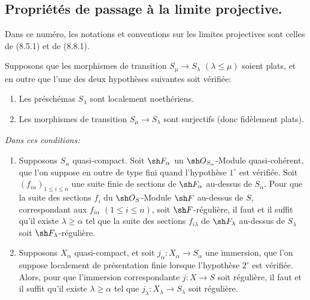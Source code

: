 \subsection{Propriétés de passage à la limite projective.}
\label{IV.19.8}

Dans ce numéro, les notations et conventions sur les limites projectives sont celles de (8.5.1) et de (8.8.1).

\begin{proposition}[19.8.1]
\label{IV.19.8.1}
Supposons que les morphismes de transition $S_\mu\to S_\lambda$ $(\lambda\leq\mu)$ soient plats, et en outre que l'une des deux hypothèses suivantes soit vérifiée:
\begin{enumerate}
  \item[$1^\circ$] Les préschémas $S_\lambda$ sont localement noethériens.
  \item[$2^\circ$] Les morphismes de transition $S_\mu\to S_\lambda$ sont surjectifs (donc fidèlement plats).
\end{enumerate}


\emph{Dans ces conditions:}
\begin{enumerate}
  \item[(i)] Supposons $S_\alpha$ quasi-compact. Soit $\sh F_\alpha$ un $\sh O_{S_\alpha}$-Module quasi-cohérent, que l'on suppose en outre de type fini quand l'hypothèse $1^\circ$ est vérifiée. Soit $(f_{i\alpha})_{1\leq i\leq n}$ une suite finie de sections de $\sh F_\alpha$ au-dessus de $S_\alpha$. Pour que la suite des sections $f_i$ du $\sh O_S$-Module $\sh F$ au-dessus de $S$, correspondant aux $f_{i\alpha}$ $(1\leq i\leq n)$, soit $\sh F$-régulière, il faut et il suffit qu'il existe $\lambda\geq\alpha$ tel que la suite des sections $f_{i\lambda}$ de $\sh F_\lambda$ au-dessus de $S_\lambda$ soit $\sh F_\lambda$-régulière.
  \item[(ii)] Supposons $X_\alpha$ quasi-compact, et soit $j_\alpha:X_\alpha\to S_\alpha$ une immersion, que l'on suppose localement de présentation finie lorsque l'hypothèse $2^\circ$ est vérifiée. Alors, pour que l'immersion correspondante $j:X\to S$ soit régulière, il faut et il suffit qu'il existe $\lambda\geq\alpha$ tel que $j_\lambda:X_\lambda\to S_\lambda$ soit régulière.
\end{enumerate}
\end{proposition}

